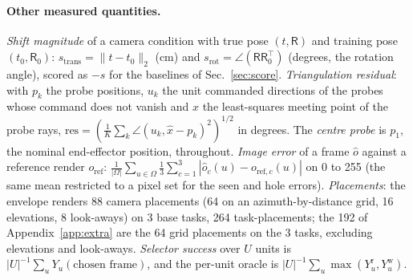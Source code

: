 \documentclass{article}
\newcommand{\ph}{\textsuperscript{\dag}}
\begin{document}
\paragraph{Other measured quantities\ph.} \emph{Shift magnitude} of a camera condition with true pose $(t, \mathsf R)$ and
training pose $(t_0, \mathsf R_0)$: $s_{\mathrm{trans}} = \|t - t_0\|_2$ (cm) and $s_{\mathrm{rot}} = \angle(\mathsf
R\mathsf R_0^\top)$ (degrees, the rotation angle), scored as $-s$ for the baselines of Sec.~\ref{sec:score}.
\emph{Triangulation residual}: with $p_k$ the probe positions, $u_k$ the unit commanded directions of the probes whose
command does not vanish and $\hat x$ the least-squares meeting point of the probe rays,
$\mathrm{res} = (\tfrac1K\sum_k \angle(u_k, \hat x - p_k)^2)^{1/2}$ in degrees. The
\emph{centre probe} is $p_1$, the nominal end-effector position, throughout. \emph{Image error} of a frame $\hat o$
against a reference render $o_{\mathrm{ref}}$: $\frac{1}{|\Omega|}\sum_{u\in\Omega}\frac13\sum_{c=1}^3|\hat o_c(u) -
o_{\mathrm{ref},c}(u)|$ on 0 to 255 (the same mean restricted to a pixel set for the seen
and hole errors). \emph{Placements}: the envelope renders 88 camera placements (64 on an azimuth-by-distance grid, 16
elevations, 8 look-aways) on 3 base tasks, 264 task-placements; the 192 of Appendix~\ref{app:extra} are the 64 grid
placements on the 3 tasks, excluding elevations and look-aways. \emph{Selector success} over $U$ units is
$|U|^{-1}\sum_u Y_u(\text{chosen frame})$, and the per-unit oracle is $|U|^{-1}\sum_u \max(Y_u^{\mathrm
r}, Y_u^{\mathrm w})$.
\end{document}
